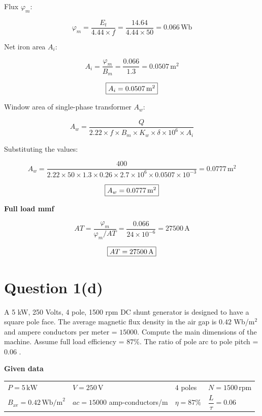 \documentclass[12pt]{article}
\begin{document}
Flux $\varphi_m$:

\[
\varphi_m = \frac{E_t}{4.44 \times f} = \frac{14.64}{4.44 \times 50} = 0.066 \, \text{Wb}
\]

Net iron area $A_i$:

\[
A_i = \frac{\varphi_m}{B_m} = \frac{0.066}{1.3} = 0.0507 \, \text{m}^2
\]

\[
\fbox{$A_i = 0.0507 \, \text{m}^2$}
\]

\vspace{5pt}

Window area of single-phase transformer $A_w$:

\[
A_w = \frac{Q}{2.22 \times f \times B_m \times K_w \times \delta \times 10^6 \times A_i}
\]

Substituting the values:

\[
A_w = \frac{400}{2.22 \times 50 \times 1.3 \times 0.26 \times 2.7 \times 10^6 \times 0.0507 \times 10^{-3}} = 0.0777 \, \text{m}^2
\]

\[
\fbox{$A_w = 0.0777 \, \text{m}^2$}
\]

\vspace{10pt}

\noindent
\textbf{Full load mmf}

\[
AT = \frac{\varphi_m}{\varphi_m/AT} = \frac{0.066}{24 \times 10^{-6}} = 27500 \, \text{A}
\]

\[
\fbox{$AT = 27500 \, \text{A}$}
\]


\section*{Question 1(d)}

A 5 kW, 250 Volts, 4 pole, 1500 rpm DC shunt generator is designed to have a square pole face. The average magnetic flux density in the air gap is $0.42$ Wb/m$^2$ and ampere conductors per meter = $15000$. Compute the main dimensions of the machine. Assume full load efficiency = $87\%$. The ratio of pole arc to pole pitch = $0.06$ .

\vspace{10pt}

\noindent
\textbf{Given data}

\vspace{5pt}

\begin{center}
	\begin{tabular}{>{\raggedright\arraybackslash}p{3.5cm} >{\raggedright\arraybackslash}p{3.5cm} >{\raggedright\arraybackslash}p{3.5cm} >{\raggedright\arraybackslash}p{3.5cm}}
		$P = 5\, \text{kW}$ & $V = 250\, \text{V}$ & $4$ poles & $N = 1500\, \text{rpm}$ \\
		$B_{\text{av}} = 0.42\, \text{Wb/m}^2$ & $ac = 15000$ amp-conductors/m & $\eta = 87\%$ & $\dfrac{L}{\tau} = 0.06$ \\
	\end{tabular}
\end{center}
\end{document}

